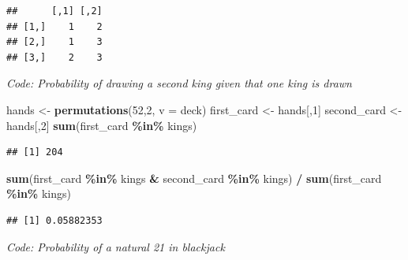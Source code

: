 \documentclass[
]{article}
\newenvironment{Shaded}{\begin{snugshade}}{\end{snugshade}}
\newcommand{\DataTypeTok}[1]{\textcolor[rgb]{0.13,0.29,0.53}{#1}}
\newcommand{\DecValTok}[1]{\textcolor[rgb]{0.00,0.00,0.81}{#1}}
\newcommand{\KeywordTok}[1]{\textcolor[rgb]{0.13,0.29,0.53}{\textbf{#1}}}
\newcommand{\NormalTok}[1]{#1}
\newcommand{\OperatorTok}[1]{\textcolor[rgb]{0.81,0.36,0.00}{\textbf{#1}}}
\newcommand{\StringTok}[1]{\textcolor[rgb]{0.31,0.60,0.02}{#1}}
\begin{document}
\begin{verbatim}
##      [,1] [,2]
## [1,]    1    2
## [2,]    1    3
## [3,]    2    3
\end{verbatim}

\emph{Code: Probability of drawing a second king given that one king is
drawn}

\begin{Shaded}
\begin{Highlighting}[]
\NormalTok{hands \textless{}{-}}\StringTok{ }\KeywordTok{permutations}\NormalTok{(}\DecValTok{52}\NormalTok{,}\DecValTok{2}\NormalTok{, }\DataTypeTok{v =}\NormalTok{ deck)}
\NormalTok{first\_card \textless{}{-}}\StringTok{ }\NormalTok{hands[,}\DecValTok{1}\NormalTok{]}
\NormalTok{second\_card \textless{}{-}}\StringTok{ }\NormalTok{hands[,}\DecValTok{2}\NormalTok{]}
\KeywordTok{sum}\NormalTok{(first\_card }\OperatorTok{\%in\%}\StringTok{ }\NormalTok{kings)}
\end{Highlighting}
\end{Shaded}

\begin{verbatim}
## [1] 204
\end{verbatim}

\begin{Shaded}
\begin{Highlighting}[]
\KeywordTok{sum}\NormalTok{(first\_card }\OperatorTok{\%in\%}\StringTok{ }\NormalTok{kings }\OperatorTok{\&}\StringTok{ }\NormalTok{second\_card }\OperatorTok{\%in\%}\StringTok{ }\NormalTok{kings) }\OperatorTok{/}\StringTok{ }\KeywordTok{sum}\NormalTok{(first\_card }\OperatorTok{\%in\%}\StringTok{ }\NormalTok{kings)}
\end{Highlighting}
\end{Shaded}

\begin{verbatim}
## [1] 0.05882353
\end{verbatim}

\emph{Code: Probability of a natural 21 in blackjack}
\end{document}
